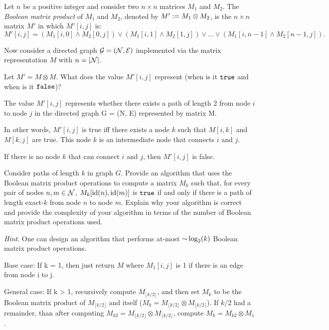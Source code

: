 \begin{problem}
Let $n$ be a positive integer and consider two $n \times n$ matrices $M_1$ and $M_2$. The \emph{Boolean matrix product} of $M_1$ and $M_2$, denoted by $M' := M_1 \otimes M_2$, is the $n \times n$ matrix $M'$ in which $M'[i, j]$ is:
\[ M'[i, j] = (M_1[i, 0] \land M_2[0, j]) \lor (M_1[i, 1] \land M_2[1, j]) \lor \dots \lor (M_1[i, n-1] \land M_2[n-1,j]). \]

Now consider a directed graph $\mathcal{G} = (\mathcal{N}, \mathcal{E})$ implemented via the matrix representation $M$ with $n = \lvert \mathcal{N} \rvert$.
\begin{questions}
\item Let $M' = M \otimes M$. What does the value $M'[i,j]$ represent (when is it $\texttt{true}$ and when is it $\texttt{false}$)?

The value $M'[i, j]$ represents whether there exists a path of length 2 from node $i$ to node $j$ in the directed graph G = (N, E) represented by matrix M.

In other words, $M'[i, j]$ is true iff there exists a node $k$ such that $M[i, k]$ and $M[k, j]$ are true. This node $k$ is an intermediate node that connects $i$ and $j$.

If there is no node $k$ that can connect $i$ and $j$, then $M'[i, j]$ is false.

\item Consider paths of length $k$ in graph $G$. Provide an algorithm that uses the Boolean matrix product operations to compute a matrix $M_k$ such that, for every pair of nodes $n, m \in \mathcal{N}$, $M_k[\operatorname{id}(n), \operatorname{id}(m)]$ is $\texttt{true}$ if and only if there is a path of length exact-$k$ from node $n$ to node $m$. Explain why your algorithm is correct and provide the complexity of your algorithm in terms of the number of Boolean matrix product operations used.

\textit{Hint}. One can design an algorithm that performs at-most $\mathord{\sim}\log_2(k)$ Boolean matrix product operations.

Base case: If k = 1, then just return $M$ where $M_1[i,j]$ is 1 if there is an edge from node i to j. 

General case: If k > 1, recursively compute $M_{\lfloor{k/2}\rfloor}$, and then set $M_k$ to be the Boolean matrix product of $M_{\lfloor{k/2}\rfloor}$ and itself ($M_k = M_{\lfloor{k/2}\rfloor} \otimes M_{\lfloor{k/2}\rfloor}$).
If $k/2$ had a remainder, than after computing $M_{k2} = M_{\lfloor{k/2}\rfloor} \otimes M_{\lfloor{k/2}\rfloor}$, compute $M_k = M_{k2} \otimes M_1$.


\end{questions}
\end{problem}
